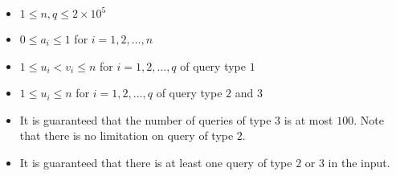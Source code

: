 \begin{itemize}
\tightlist
\item $1 \leq n, q \leq 2 \times 10 ^ 5$
\item $0 \leq a_i \leq 1$ for $i = 1, 2, \ldots, n$
\item $1 \leq u_i < v_i \leq n$ for $i = 1, 2, \ldots, q$ of query type $1$
\item $1 \leq u_i \leq n$ for $i = 1, 2, \ldots, q$ of query type $2$ and $3$
\item It is guaranteed that the number of queries of type $3$ is at most $100$.
Note that there is no limitation on query of type $2$.
\item It is guaranteed that there is at least one query of type $2$ or $3$ in the input.
\end{itemize}
